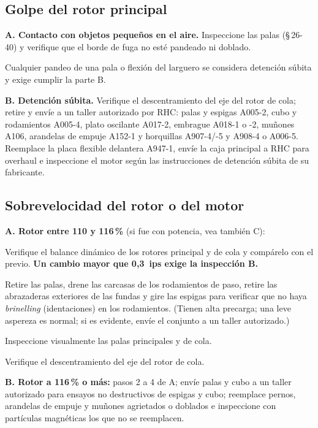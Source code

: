 \subsection{Golpe del rotor principal}

\textbf{A. Contacto con objetos pequeños en el aire.} Inspeccione las palas (\S\,26-40) y verifique que el borde de fuga no esté pandeado ni doblado.

\begin{advertencia}
Cualquier pandeo de una pala o flexión del larguero se considera detención súbita y exige cumplir la parte B.
\end{advertencia}

\textbf{B. Detención súbita.} Verifique el descentramiento del eje del rotor de cola; retire y envíe a un taller autorizado por RHC: palas y espigas A005-2, cubo y rodamientos A005-4, plato oscilante A017-2, embrague A018-1 o -2, muñones A106, arandelas de empuje A152-1 y horquillas A907-4/-5 y A908-4 o A006-5. Reemplace la placa flexible delantera A947-1, envíe la caja principal a RHC para overhaul e inspeccione el motor según las instrucciones de detención súbita de su fabricante.

\subsection{Sobrevelocidad del rotor o del motor}

\textbf{A. Rotor entre 110 y 116\,\%} (si fue con potencia, vea también C):
\begin{pasos}
\item Verifique el balance dinámico de los rotores principal y de cola y compárelo con el previo. \textbf{Un cambio mayor que 0,3~ips exige la inspección B.}
\item Retire las palas, drene las carcasas de los rodamientos de paso, retire las abrazaderas exteriores de las fundas y gire las espigas para verificar que no haya \emph{brinelling} (identaciones) en los rodamientos. (Tienen alta precarga; una leve aspereza es normal; si es evidente, envíe el conjunto a un taller autorizado.)
\item Inspeccione visualmente las palas principales y de cola.
\item Verifique el descentramiento del eje del rotor de cola.
\end{pasos}

\textbf{B. Rotor a 116\,\% o más:} pasos 2 a 4 de A; envíe palas y cubo a un taller autorizado para ensayos no destructivos de espigas y cubo; reemplace pernos, arandelas de empuje y muñones agrietados o doblados e inspeccione con partículas magnéticas los que no se reemplacen.

